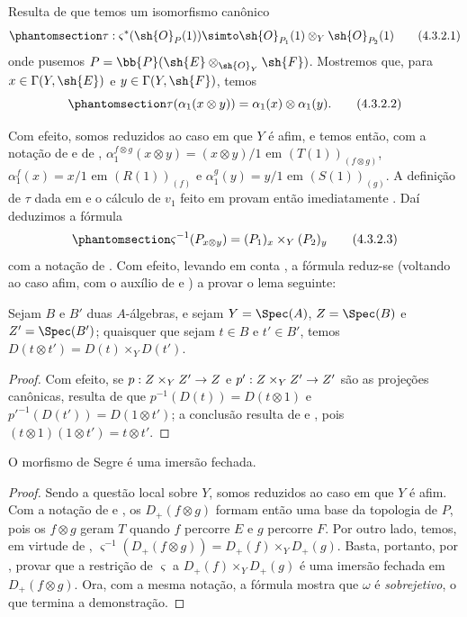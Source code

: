 \documentclass[oneside,10pt]{amsart}
\makeatletter
\newcommand{\ega@arrow}[2]{\mathchoice{#1}{#2}{#2}{#2}}
\renewcommand{\to}{\ega@arrow{\longrightarrow}{\rightarrow}}
\let\EGAOriginalLabel\label
\renewcommand{\label}[1]{\phantomsection\EGAOriginalLabel{#1}}
\makeatother
\begin{document}
\begin{env}[4.3.2]
\label{II.4.3.2}
Resulta de  que temos um isomorfismo canônico
\[
\label{II.4.3.2.1}
  \tau:\varsigma^*(\sh{O}_P(1))\simto\sh{O}_{P_1}(1)\otimes_Y\sh{O}_{P_2}(1)
  \tag{4.3.2.1}
\]
onde pusemos $P=\bb{P}(\sh{E}\otimes_{\sh{O}_Y}\sh{F})$.
Mostremos que, para $x\in\Gamma(Y,\sh{E})$ e $y\in\Gamma(Y,\sh{F})$, temos
\[
\label{II.4.3.2.2}
  \tau(\alpha_1(x\otimes y))=\alpha_1(x)\otimes\alpha_1(y).
  \tag{4.3.2.2}
\]

Com efeito, somos reduzidos ao caso em que $Y$ é afim, e temos então, com a notação de  e de , $\alpha_1^{f\otimes g}(x\otimes y)=(x\otimes y)/1$ em $(T(1))_{(f\otimes g)}$, $\alpha_1^f(x)=x/1$ em $(R(1))_{(f)}$ e $\alpha_1^g(y)=y/1$ em $(S(1))_{(g)}$.
A definição de $\tau$ dada em  e o cálculo de $v_1$ feito em  provam então imediatamente .
Daí deduzimos a fórmula
\[
\label{II.4.3.2.3}
  \varsigma^{-1}(P_{x\otimes y})=(P_1)_x\times_Y(P_2)_y
  \tag{4.3.2.3}
\]
com a notação de .
Com efeito, levando em conta , a fórmula  reduz-se (voltando ao caso afim, com o auxílio de  e ) a provar o lema seguinte:

\begin{lemma}[4.3.2.4]
\label{II.4.3.2.4}
Sejam $B$ e $B'$ duas $A$-álgebras, e sejam $Y=\Spec(A)$, $Z=\Spec(B)$ e $Z'=\Spec(B')$;
quaisquer que sejam $t\in B$ e $t'\in B'$, temos $D(t\otimes t')=D(t)\times_YD(t')$.
\end{lemma}

\begin{proof}
Com efeito, se $p:Z\times_YZ'\to Z$ e $p':Z\times_YZ'\to Z'$ são as projeções canônicas, resulta de  que $p^{-1}(D(t))=D(t\otimes1)$ e ${p'}^{-1}(D(t'))=D(1\otimes t')$;
a conclusão resulta de  e , pois $(t\otimes1)(1\otimes t')=t\otimes t'$.
\end{proof}
\end{env}

\begin{proposition}[4.3.3]
\label{II.4.3.3}
O morfismo de Segre é uma imersão fechada.
\end{proposition}

\begin{proof}
Sendo a questão local sobre $Y$, somos reduzidos ao caso em que $Y$ é afim.
Com a notação de  e , os $D_+(f\otimes g)$ formam então uma base da topologia de $P$, pois os $f\otimes g$ geram $T$ quando $f$ percorre $E$ e $g$ percorre $F$.
Por outro lado, temos, em virtude de , $\varsigma^{-1}(D_+(f\otimes g))=D_+(f)\times_YD_+(g)$.
Basta, portanto, por , provar que a restrição de $\varsigma$ a $D_+(f)\times_YD_+(g)$ é uma imersão fechada em $D_+(f\otimes g)$.
Ora, com a mesma notação, a fórmula  mostra que $\omega$ é \emph{sobrejetivo}, o que termina a demonstração.
\end{proof}
\end{document}
